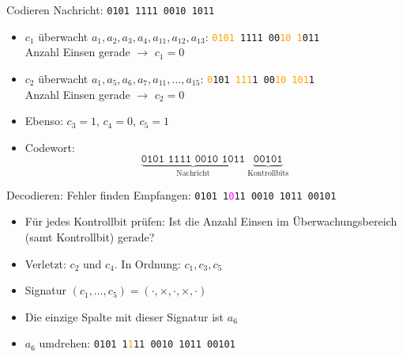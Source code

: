 \begin{frame}{Codieren}
    Nachricht: \texttt{0101 1111 0010 1011}
    \begin{itemize}[<+->]
        \item \(c_1\) überwacht \(a_1, a_2, a_3, a_4, a_{11}, a_{12}, a_{13}\):
              \texttt{\textcolor{orange}{0101} 1111 00\textcolor{orange}{10 1}011}\\
              Anzahl Einsen gerade $\rightarrow$ \(c_1 = 0\)
        \item \(c_2\) überwacht \(a_1, a_5, a_6, a_7, a_{11}, \ldots, a_{15}\):
              \texttt{\textcolor{orange}{0}101 \textcolor{orange}{111}1 00\textcolor{orange}{10 101}1}\\
              Anzahl Einsen gerade $\rightarrow$ \(c_2 = 0\)
        \item Ebenso: \(c_3 = 1\), \(c_4 = 0\), \(c_5 = 1\)
        \item Codewort:
              \[
                  \underbrace{\texttt{0101 1111 0010 1011}}_{\text{Nachricht}}
                  \ \underbrace{\texttt{00101}}_{\text{Kontrollbits}}
              \]
    \end{itemize}
\end{frame}


\begin{frame}{Decodieren: Fehler finden}
    Empfangen: \texttt{0101 1\textcolor{magenta}{0}11 0010 1011 00101}
    \begin{itemize}[<+->]
        \item Für jedes Kontrollbit prüfen: Ist die Anzahl Einsen im Überwachungsbereich (samt Kontrollbit) gerade?
        \item Verletzt: \(c_2\) und \(c_4\). In Ordnung: \(c_1, c_3, c_5\)
        \item Signatur \((c_1, \ldots, c_5) = (\cdot, \times, \cdot, \times, \cdot)\)
        \item Die einzige Spalte mit dieser Signatur ist \(a_6\)
        \item \(a_6\) umdrehen: \texttt{0101 1\textcolor{orange}{1}11 0010 1011 00101}
    \end{itemize}
\end{frame}


\def\bereichA{1,2,4,5}
\def\bereichB{1,3,4,6}
\def\bereichC{2,3,4,7}

